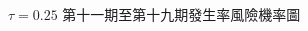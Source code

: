 \documentclass[12pt,a4paper]{article}
\begin{document}
\begin{CJK}{UTF8}{bkai}
\begin{figure}[htpb]
\caption{$\tau = 0.25$ 第十一期至第十九期發生率風險機率圖}
\label{Fig.main8}
\end{figure}


\end{CJK}
\end{document}
